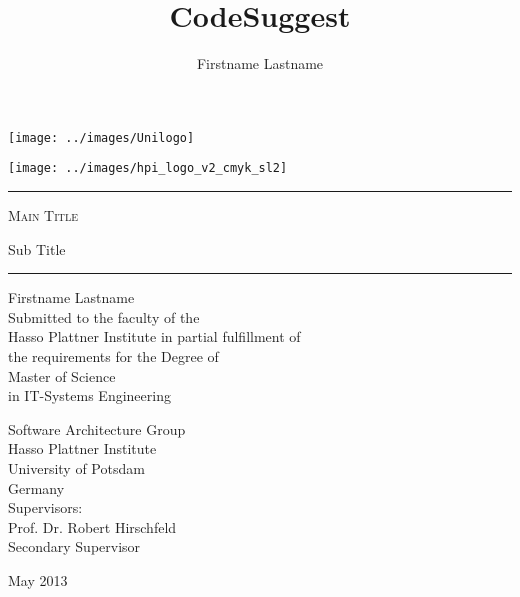\title{CodeSuggest}
\author{Firstname Lastname}
\begin{titlepage}
\pagestyle{empty}

\noindent
\begin{minipage}[b]{0.4\linewidth}
\noindent
\texttt{[image: ../images/Unilogo]}
\end{minipage}
\hfill
\begin{minipage}[b]{0.4\linewidth}
\hfill
\vspace{3mm}
\texttt{[image: ../images/hpi\_logo\_v2\_cmyk\_sl2]}
\end{minipage}

\vspace{2cm}

\begin{center}
\begin{minipage}{0.7\textwidth}
\begin{center}
\begin{large}
\hrule
\vspace{2em}
\textsc{\Huge Main Title \\[0.5em]}
\begin{doublespace}
  {\LARGE Sub Title}
  \\[1.2em]
\end{doublespace}
\hrule
\vspace{1.5cm}

{\huge Firstname Lastname } \\[1.5cm]

Submitted to the faculty of the \\
Hasso Plattner Institute in partial fulfillment of \\
the requirements for the Degree of \\[5mm]
{\Large Master of Science} \\[1mm]
in IT-Systems Engineering \\[2cm]

\begin{multicols}{2}
Software Architecture Group\\
Hasso Plattner Institute\\
University of Potsdam \\
Germany \\
Supervisors: \\
Prof. Dr. Robert Hirschfeld \\
Secondary Supervisor \\
\end{multicols}
\end{large}
\end{center}
\end{minipage}
\vfill
{\LARGE May 2013 \\ ~ }
\end{center}
\end{titlepage}
\restoregeometry
\cleardoublepage